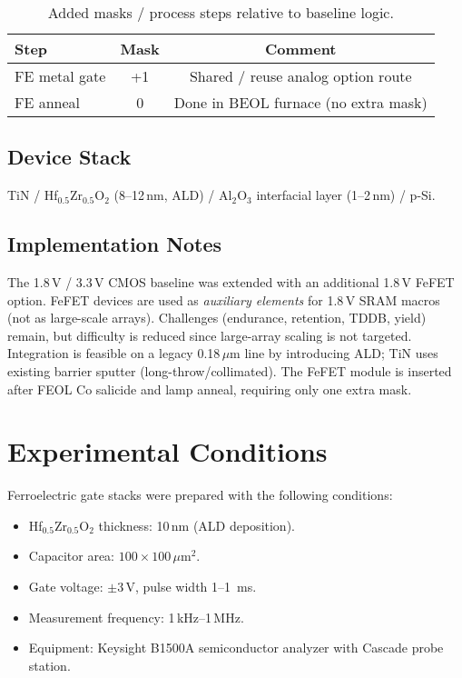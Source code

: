 \documentclass[journal]{IEEEtran}
\newcommand{\HZO}{Hf$_{0.5}$Zr$_{0.5}$O$_2$}
\begin{document}
\begin{table}[t]
  \centering
  \caption{Added masks / process steps relative to baseline logic.}
  \label{tab:masks}
  \begin{tabular}{@{}lcc@{}}
    \toprule
    \textbf{Step} & \textbf{Mask} & \textbf{Comment}\\
    \midrule
    FE metal gate & +1 & Shared / reuse analog option route\\
    FE anneal     &  0 & Done in BEOL furnace (no extra mask)\\
    \bottomrule
  \end{tabular}
\end{table}

\subsection*{Device Stack}
TiN / \HZO{} (8--12\,nm, ALD) / Al$_2$O$_3$ interfacial layer (1--2\,nm) / p-Si.

\subsection*{Implementation Notes}
The 1.8\,V / 3.3\,V CMOS baseline was extended with an additional 1.8\,V FeFET option. FeFET devices are used as \emph{auxiliary elements} for 1.8\,V SRAM macros (not as large-scale arrays). Challenges (endurance, retention, TDDB, yield) remain, but difficulty is reduced since large-array scaling is not targeted. Integration is feasible on a legacy 0.18\,$\mu$m line by introducing ALD; TiN uses existing barrier sputter (long-throw/collimated). The FeFET module is inserted after FEOL Co salicide and lamp anneal, requiring only one extra mask.

\section{Experimental Conditions}
Ferroelectric gate stacks were prepared with the following conditions:
\begin{itemize}
  \item \HZO{} thickness: 10\,nm (ALD deposition).
  \item Capacitor area: $100\times100\,\mu\mathrm{m}^2$.
  \item Gate voltage: $\pm$3\,V, pulse width 1--\SI{1}{ms}.
  \item Measurement frequency: 1\,kHz--1\,MHz.
  \item Equipment: Keysight B1500A semiconductor analyzer with Cascade probe station.
\end{itemize}
\end{document}
